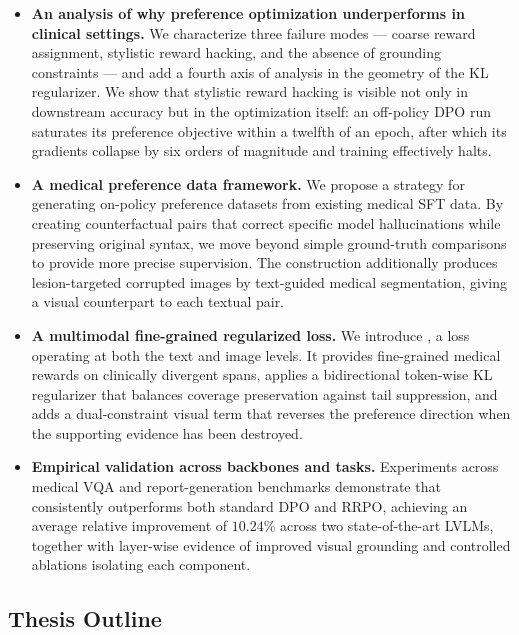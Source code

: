 \begin{itemize}
    \item \textbf{An analysis of why preference optimization underperforms in clinical settings.} We characterize three failure modes --- coarse reward assignment, stylistic reward hacking, and the absence of grounding constraints --- and add a fourth axis of analysis in the geometry of the KL regularizer. We show that stylistic reward hacking is visible not only in downstream accuracy but in the optimization itself: an off-policy DPO run saturates its preference objective within a twelfth of an epoch, after which its gradients collapse by six orders of magnitude and training effectively halts.

    \item \textbf{A medical preference data framework.} We propose a strategy for generating on-policy preference datasets from existing medical SFT data. By creating counterfactual pairs that correct specific model hallucinations while preserving original syntax, we move beyond simple ground-truth comparisons to provide more precise supervision. The construction additionally produces lesion-targeted corrupted images by text-guided medical segmentation, giving a visual counterpart to each textual pair.

    \item \textbf{A multimodal fine-grained regularized loss.} We introduce \ourloss{}, a loss operating at both the text and image levels. It provides fine-grained medical rewards on clinically divergent spans, applies a bidirectional token-wise KL regularizer that balances coverage preservation against tail suppression, and adds a dual-constraint visual term that reverses the preference direction when the supporting evidence has been destroyed.

    \item \textbf{Empirical validation across backbones and tasks.} Experiments across medical VQA and report-generation benchmarks demonstrate that \ourloss{} consistently outperforms both standard DPO and RRPO, achieving an average relative improvement of $10.24\%$ across two state-of-the-art LVLMs, together with layer-wise evidence of improved visual grounding and controlled ablations isolating each component.
\end{itemize}

\subsection{Thesis Outline}
\label{sec:intro:outline}


